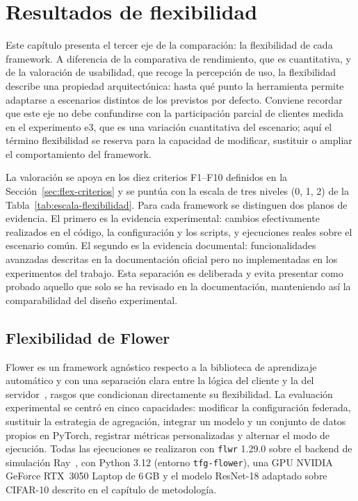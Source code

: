 
\chapter{Resultados de flexibilidad}\label{chap:flexibilidad}

Este capítulo presenta el tercer eje de la comparación: la flexibilidad de
cada framework. A diferencia de la comparativa de rendimiento, que es
cuantitativa, y de la valoración de usabilidad, que recoge la percepción de uso,
la flexibilidad describe una propiedad arquitectónica: hasta qué punto la
herramienta permite adaptarse a escenarios distintos de los previstos por defecto.
Conviene recordar que este eje no debe confundirse con la participación parcial
de clientes medida en el experimento e3, que es una variación cuantitativa del
escenario; aquí el término flexibilidad se reserva para la capacidad de
modificar, sustituir o ampliar el comportamiento del framework.

La valoración se apoya en los diez criterios F1--F10 definidos en la
Sección~\ref{sec:flex-criterios} y se puntúa con la escala de tres niveles
(0, 1, 2) de la Tabla~\ref{tab:escala-flexibilidad}. Para cada framework se
distinguen dos planos de evidencia. El primero es la evidencia experimental:
cambios efectivamente realizados en el código, la configuración y los scripts, y
ejecuciones reales sobre el escenario común. El segundo es la evidencia
documental: funcionalidades avanzadas descritas en la documentación oficial pero
no implementadas en los experimentos del trabajo. Esta separación es deliberada y
evita presentar como probado aquello que solo se ha revisado en la documentación,
manteniendo así la comparabilidad del diseño experimental.

\section{Flexibilidad de Flower}\label{sec:flex-flower}

Flower es un framework agnóstico respecto a la biblioteca de aprendizaje
automático y con una separación clara entre la lógica del cliente y la del
servidor~\parencite{beutel2020flower}, rasgos que condicionan directamente su
flexibilidad. La evaluación experimental se centró en cinco capacidades: modificar
la configuración federada, sustituir la estrategia de agregación, integrar un
modelo y un conjunto de datos propios en PyTorch, registrar métricas personalizadas
y alternar el modo de ejecución. Todas las ejecuciones se realizaron con
\texttt{flwr} 1.29.0 sobre el backend de simulación Ray~\parencite{moritz2018ray},
con Python 3.12 (entorno \texttt{tfg-flower}), una GPU NVIDIA GeForce RTX~3050
Laptop de 6\,GB y el modelo ResNet-18 adaptado sobre CIFAR-10 descrito en el
capítulo de metodología.

